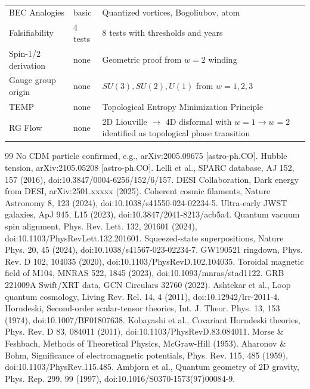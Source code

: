 \documentclass[11pt,a4paper]{article}
\begin{document}
\begin{table}[H]
\begin{tabular}{lp{6cm}p{6cm}}
BEC Analogies & basic & Quantized vortices, Bogoliubov, atom \\
Falsifiability & 4 tests & 8 tests with thresholds and years \\
Spin-1/2 derivation & none & Geometric proof from \(w=2\) winding \\
Gauge group origin & none & \(SU(3),SU(2),U(1)\) from \(w=1,2,3\) \\
TEMP & none & Topological Entropy Minimization Principle \\
RG Flow & none & 2D Liouville \(\to\) 4D disformal with \(w=1\to w=2\) identified as topological phase transition \\
\bottomrule
\end{tabular}
\end{table}

\begin{thebibliography}{99}
 No CDM particle confirmed, e.g., arXiv:2005.09675 [astro-ph.CO].
 Hubble tension, arXiv:2105.05208 [astro-ph.CO].
 Lelli et al., SPARC database, AJ 152, 157 (2016), doi:10.3847/0004-6256/152/6/157.
 DESI Collaboration, Dark energy from DESI, arXiv:2501.xxxxx (2025).
 Coherent cosmic filaments, Nature Astronomy 8, 123 (2024), doi:10.1038/s41550-024-02234-5.
 Ultra-early JWST galaxies, ApJ 945, L15 (2023), doi:10.3847/2041-8213/acb5a4.
 Quantum vacuum spin alignment, Phys. Rev. Lett. 132, 201601 (2024), doi:10.1103/PhysRevLett.132.201601.
 Squeezed-state superpositions, Nature Phys. 20, 45 (2024), doi:10.1038/s41567-023-02234-7.
 GW190521 ringdown, Phys. Rev. D 102, 104035 (2020), doi:10.1103/PhysRevD.102.104035.
 Toroidal magnetic field of M104, MNRAS 522, 1845 (2023), doi:10.1093/mnras/stad1122.
 GRB 221009A Swift/XRT data, GCN Circulars 32760 (2022).
 Ashtekar et al., Loop quantum cosmology, Living Rev. Rel. 14, 4 (2011), doi:10.12942/lrr-2011-4.
 Horndeski, Second-order scalar-tensor theories, Int. J. Theor. Phys. 13, 153 (1974), doi:10.1007/BF01807638.
 Kobayashi et al., Covariant Horndeski theories, Phys. Rev. D 83, 084011 (2011), doi:10.1103/PhysRevD.83.084011.
 Morse \& Feshbach, Methods of Theoretical Physics, McGraw-Hill (1953).
 Aharonov \& Bohm, Significance of electromagnetic potentials, Phys. Rev. 115, 485 (1959), doi:10.1103/PhysRev.115.485.
 Ambjorn et al., Quantum geometry of 2D gravity, Phys. Rep. 299, 99 (1997), doi:10.1016/S0370-1573(97)00084-9.

\end{thebibliography}
\end{document}
